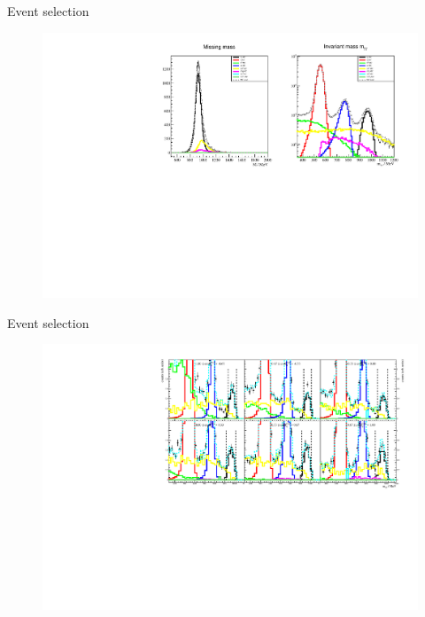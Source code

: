 \documentclass[11pt,aspectratio=169,dvipsnames]{beamer}
\begin{document}
\begin{frame}{Event selection}
	\begin{figure}
		\centering
		\includegraphics[width=\linewidth]{../../figs/hydrogen/global_mism_inv.pdf}
	\end{figure}
\end{frame}
	\begin{frame}{Event selection}
		\begin{figure}
			\centering
			\includegraphics[width=\linewidth]{invcut_ebin0.pdf}
		\end{figure}
		
	\end{frame}
\end{document}
